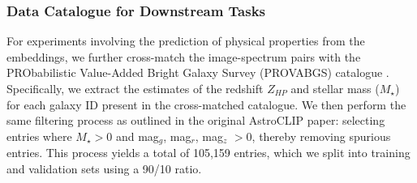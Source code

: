 \documentclass[a4paper,12pt]{article}
\begin{document}
\subsubsection{Data Catalogue for Downstream Tasks}
For experiments involving the prediction of physical properties from the embeddings, we further cross-match the image-spectrum pairs with the PRObabilistic Value-Added Bright Galaxy Survey (PROVABGS) catalogue \cite{PROVABGS}. Specifically, we extract the estimates of the redshift $Z_{HP}$ and stellar mass ($M_{\star}$) for each galaxy ID present in the cross-matched catalogue. We then perform the same filtering process as outlined in the original AstroCLIP paper: selecting entries where $M_{\star} > 0$ and mag$_g$, mag$_r$, mag$_z$ $> 0$, thereby removing spurious entries. This process yields a total of 105,159 entries, which we split into training and validation sets using a 90/10 ratio.
\end{document}
